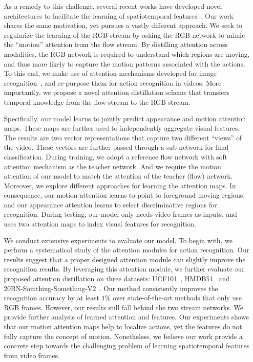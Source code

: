 \documentclass[10pt,twocolumn,letterpaper]{article}
\begin{document}
As a remedy to this challenge, several recent works have developed novel architectures to facilitate the learning of spatiotemporal features~\cite{Hara_2018_CVPR,Tran_2018_CVPR,Xie_2018_ECCV,Sun_2018_CVPR,fan2018end}. Our work shares the same motivation, yet pursues a vastly different approach. We seek to regularize the learning of the RGB stream by asking the RGB network to mimic the ``motion'' attention from the flow stream. By distilling attention across modalities, the RGB network is required to understand which regions are moving, and thus more likely to capture the motion patterns associated with the actions. To this end, we make use of attention mechanisms developed for image recognition~\cite{wang2017residual,Zagoruyko2017AT}, and re-purpose them for action recognition in videos. More importantly, we propose a novel attention distillation scheme that transfers temporal knowledge from the flow stream to the RGB stream. 

Specifically, our model learns to jointly predict appearance and motion attention maps. These maps are further used to independently aggregate visual features. The results are two vector representations that capture two different ``views'' of the video. These vectors are further passed through a sub-network for final classification. During training, we adopt a reference flow network with soft attention mechanism as the teacher network. And we require the motion attention of our model to match the attention of the teacher (flow) network. Moreover, we explore different approaches for learning the attention maps. In consequence, our motion attention learns to point to foreground moving regions, and our appearance attention learns to select discriminative regions for recognition. During testing, our model only needs video frames as inputs, and uses two attention maps to index visual features for recognition. 

We conduct extensive experiments to evaluate our model. To begin with, we perform a systematical study of the attention modules for action recognition. Our results suggest that a proper designed attention module can slightly improve the recognition results. By leveraging this attention module, we further evaluate our proposed attention distillation on three datasets: UCF101~\cite{Soomro2012UCF101AD}, HMDB51~\cite{kuehne2011hmdb} and 20BN-Somthing-Something-V2~\cite{goyal2017something,mahdisoltani2018fine}. Our method consistently improves the recognition accuracy by at least $1\%$ over state-of-the-art methods that only use RGB frames. However, our results still fall behind the two stream networks. We provide further analysis of learned attention and features. Our experiments shows that our motion attention maps help to localize actions, yet the features do not fully capture the concept of motion. Nonetheless, we believe our work provide a concrete step towards the challenging problem of learning spatiotemporal features from video frames. 
\end{document}

